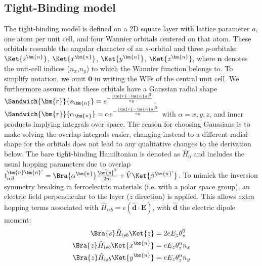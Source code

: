 \subsection{Tight-Binding model}
The tight-binding model is defined on a 2D square layer with lattice parameter $a$, one atom per unit cell, and four Wannier orbitals centered on that atom.
These orbitals resemble the angular character of an $s$-orbital and three $p$-orbitals: $\Ket{s^{\bm{n}}}$, $\Ket{x^{\bm{n}}}$, $\Ket{y^{\bm{n}}}$, $\Ket{z^{\bm{n}}}$, where $\bm{n}$ denotes the unit-cell indices ($n_x$,$n_y$) to which the Wannier function belongs to.
To simplify notation, we omit $\bm{0}$ in writing the WFs of the central unit cell.
We furthermore assume that these orbitals have a Gaussian radial shape $\Sandwich{\bm{r}}{s_{\bm{n}}} = e^{-\frac{|\bm{r}-\bm{n}a|^2}{a_0}}$, $\Sandwich{\bm{r}}{\alpha_{\bm{n}}} = \alpha e^{-\frac{|\bm{r}-\bm{n}a|^2}{a_0}}$ with $\alpha = x, y, z$, and inner products implying integrals over space.
The reason for choosing Gaussians is to make solving the overlap integrals easier, changing instead to a different radial shape for the orbitals does not lead to any qualitative changes to the derivation below.
The bare tight-binding Hamiltonian is denoted as $\hat{H}_0$ and includes the usual hopping parameters due to overlap $t_{\alpha\beta}^{\bm{n}\bm{n}'} = \Bra{\alpha^{\bm{n}}}\frac{\hat{\bm{p}}^2}{2m} + \hat{V}\Ket{\beta^{\bm{n}'}}$.
To mimick the inversion symmetry breaking in ferroelectric materials (i.e. with a polar space group), an electric field perpendicular to the layer ($z$ direction) is applied.
This allows extra hopping terms associated with $\hat{H}_{isb} = e (\hat{\bm{d}}\cdot \bm{E})$, with $\hat{\bm{d}}$ the electric dipole moment:
\begin{align}
	\label{eq:dipole}
	\Bra{s} \hat{H}_{isb} \Ket{z} &= 2 e E_z \theta_z^0\\
	\Bra{z} \hat{H}_{isb} \Ket{x^{\bm{n}}} &= e E_z \theta_z^n n_x\\
	\Bra{z} \hat{H}_{isb} \Ket{y^{\bm{n}}} &= e E_z \theta_z^n n_y
\end{align}
